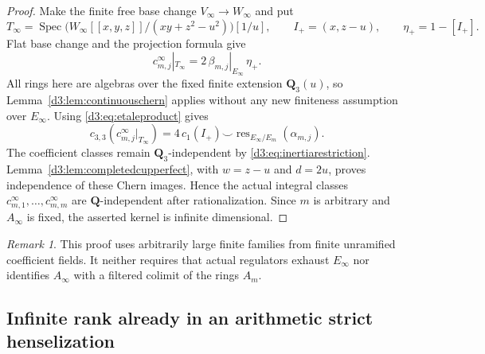 \documentclass[11pt,a4paper]{amsart}
\numberwithin{equation}{section}
\theoremstyle{definition}
\theoremstyle{remark}
\newtheorem{remark}[theorem]{Remark}
\newcommand{\Q}{\mathbf Q}
\newcommand{\Spec}{\operatorname{Spec}}
\begin{document}
\begin{proof}
Make the finite free base change $V_\infty\to W_\infty$ and put
\[
 T_\infty=\Spec
 \bigl(W_\infty[[x,y,z]]/(xy+z^2-u^2)\bigr)[1/u],
 \qquad I_+=(x,z-u),\qquad \eta_+=1-[I_+].
\]
Flat base change and the projection formula give
\[
 c^\infty_{m,j}|_{T_\infty}
      =2\,\beta_{m,j}|_{E_\infty}\,\eta_+.
\]
All rings here are algebras over the fixed finite extension
$\Q_3(u)$, so Lemma~\ref{d3:lem:continuouschern} applies without any
new finiteness assumption over $E_\infty$.
Using \eqref{d3:eq:etaleproduct} gives
\[
 c_{3,3}(c^\infty_{m,j}|_{T_\infty})
   =4\,c_1(I_+)\smile
       \operatorname{res}_{E_\infty/E_m}(\alpha_{m,j}).
\]
The coefficient classes remain $\Q_3$-independent by
\eqref{d3:eq:inertiarestriction}. Lemma~\ref{d3:lem:completedcupperfect},
with $w=z-u$ and $d=2u$, proves independence of these Chern images.
Hence the actual integral classes $c^\infty_{m,1},\ldots,
c^\infty_{m,m}$ are $\Q$-independent after rationalization.
Since $m$ is arbitrary and $A_\infty$ is fixed, the asserted kernel
is infinite dimensional.
\end{proof}

\begin{remark}
This proof uses arbitrarily large finite families from finite
unramified coefficient fields. It neither requires that actual
regulators exhaust $E_\infty$ nor identifies $A_\infty$ with a
filtered colimit of the rings $A_m$.
\end{remark}


\subsection{Infinite rank already in an arithmetic strict henselization}
\label{d3:sec:stricthenseldescent}
\end{document}
